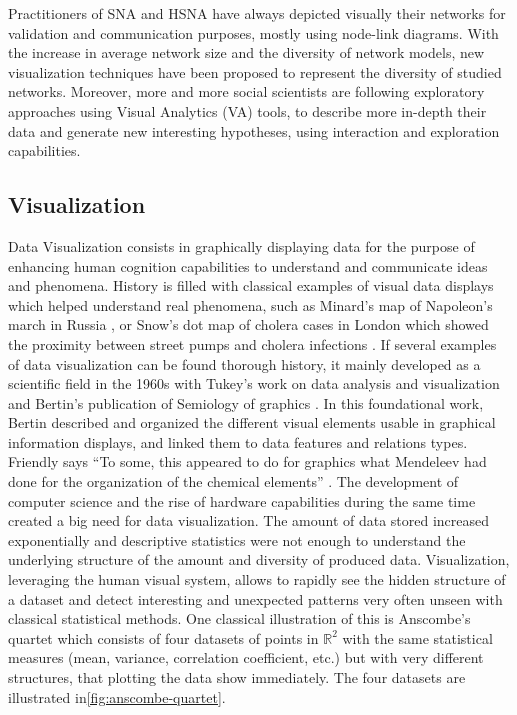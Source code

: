 Practitioners of SNA and HSNA have always depicted visually their networks for validation and communication purposes, mostly using node-link diagrams.
With the increase in average network size and the diversity of network models, new visualization techniques have been proposed to represent the diversity of studied networks.
Moreover, more and more social scientists are following exploratory approaches using Visual Analytics (VA) tools, to describe more in-depth their data and generate new interesting hypotheses, using interaction and exploration capabilities.

\subsection{Visualization}

Data Visualization consists in graphically displaying data for the purpose of enhancing human cognition capabilities to understand and communicate ideas and phenomena.
History is filled with classical examples of visual data displays which helped understand real phenomena, such as Minard's map of Napoleon's march in Russia \cite{friendlyVisionsReVisionsCharles2002}, or Snow's dot map of cholera cases in London which showed the proximity between street pumps and cholera infections \cite{snowModeCommunicationCholera1856}.
If several examples of data visualization can be found thorough history, it mainly developed as a scientific field in the 1960s with Tukey's work on data analysis and visualization \cite{tukeyFutureDataAnalysis1962} and Bertin's publication of Semiology of graphics \cite{bertin1967}.
In this foundational work, Bertin described and organized the different visual elements usable in graphical information displays, and linked them to data features and relations types.
Friendly says ``To some, this appeared to do for graphics what Mendeleev had done for the organization of the chemical elements'' \cite{friendlyBriefHistoryData2008}.
The development of computer science and the rise of hardware capabilities during the same time created a big need for data visualization.
The amount of data stored increased exponentially and descriptive statistics were not enough to understand the underlying structure of the amount and diversity of produced data.
Visualization, leveraging the human visual system, allows to rapidly see the hidden structure of a dataset and detect interesting and unexpected patterns very often unseen with classical statistical methods.
One classical illustration of this is Anscombe's quartet \cite{anscombeGraphsStatisticalAnalysis1973} which consists of four datasets of points in $\mathbb{R} ^{2}$ with the same statistical measures (mean, variance, correlation coefficient, etc.) but with very different structures, that plotting the data show immediately.
The four datasets are illustrated in\autoref{fig:anscombe-quartet}.


